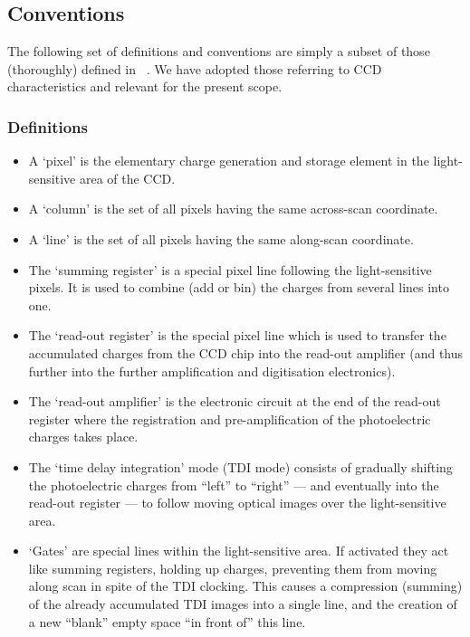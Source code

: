 \documentclass[a4paper, 11pt]{article}
\begin{document}
\newpage

\subsection{Conventions}

The following set of definitions and conventions are simply a subset of those (thoroughly) defined in ~\cite{GAIA-CA-SP-ARI-BAS-003}. We have adopted those referring to CCD characteristics and relevant for the present scope.

\subsubsection{Definitions}

\begin{itemize}
\item A `pixel' is the elementary charge generation and storage element in
the light-sensitive area of the CCD.
\item A `column' is the set of all pixels having the same across-scan
coordinate.
\item A `line' is the set of all pixels having the same along-scan
coordinate.
\item The `summing register' is a special pixel line following
the light-sensitive pixels. It is used to combine (add or bin) the charges from
several lines into one.
\item The `read-out register' is the special pixel line which is used to transfer the accumulated charges from the CCD chip
into the read-out amplifier (and thus further into the further amplification and
digitisation electronics).
\item The `read-out amplifier' is the electronic circuit at the end of the read-out register where the registration and
pre-amplification of the photoelectric charges takes place.
\item The `time delay integration' mode (TDI mode) consists of gradually shifting the photoelectric
charges from ``left'' to ``right''  --- and eventually into the read-out
register --- to follow moving optical images over the light-sensitive area.
\item `Gates' are special lines within
the light-sensitive area. If activated they act like summing registers,
holding up charges, preventing them from moving along scan in spite
of the TDI clocking. This causes a compression (summing) of the already
accumulated TDI images into a single line, and the creation of a new
``blank'' empty space ``in front of'' this line.
\end{itemize}
\end{document}
